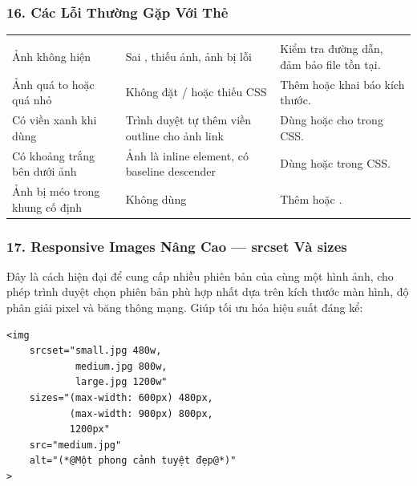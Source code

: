 \subsubsection{16. Các Lỗi Thường Gặp Với Thẻ }

\begin{prettyTableBox}
\begin{tabularx}{\linewidth}{L{3.5cm} L{4cm} Z}
 &  &  \\
Ảnh không hiện & Sai , thiếu ảnh, ảnh bị lỗi & Kiểm tra đường dẫn, đảm bảo file tồn tại. \\
Ảnh quá to hoặc quá nhỏ & Không đặt / hoặc thiếu CSS & Thêm  hoặc khai báo kích thước. \\
Có viền xanh khi dùng  & Trình duyệt tự thêm viền outline cho ảnh link & Dùng  hoặc  cho  trong CSS. \\
Có khoảng trắng bên dưới ảnh & Ảnh là inline element, có baseline descender & Dùng  hoặc  trong CSS. \\
Ảnh bị méo trong khung cố định & Không dùng  & Thêm  hoặc . \\
\end{tabularx}
\end{prettyTableBox}

\subsubsection{17. Responsive Images Nâng Cao — srcset Và sizes}

Đây là cách hiện đại để cung cấp nhiều phiên bản của cùng một hình ảnh, cho phép trình duyệt chọn phiên bản phù hợp nhất dựa trên kích thước màn hình, độ phân giải pixel và băng thông mạng. Giúp tối ưu hóa hiệu suất đáng kể:

\begin{codeWindow}
\begin{lstlisting}[language=HTML5]
<img
    srcset="small.jpg 480w,
            medium.jpg 800w,
            large.jpg 1200w"
    sizes="(max-width: 600px) 480px,
           (max-width: 900px) 800px,
           1200px"
    src="medium.jpg"
    alt="(*@Một phong cảnh tuyệt đẹp@*)"
>
\end{lstlisting}
\end{codeWindow}

